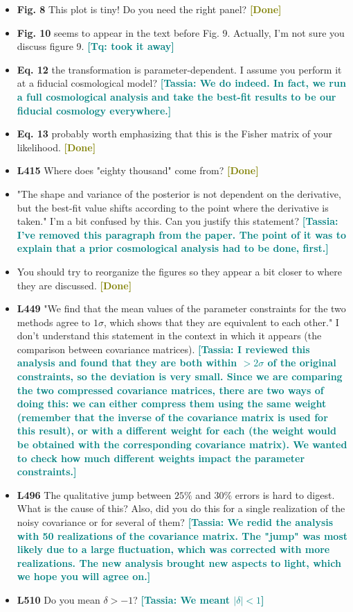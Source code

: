 \documentclass{article}
\newcommand\tassia[1]{{\bf {\textcolor{teal}{[Tassia: #1]}}}}
\newcommand\tq[1]{{\bf {\textcolor{teal}{[Tq: #1]}}}}
\newcommand\done{{\bf {\textcolor{olive}{[Done]}}}}
\begin{document}
\begin{itemize}
	\item \textbf{Fig. 8} This plot is tiny! Do you need the right panel? \done
	\item \textbf{Fig. 10} seems to appear in the text before Fig. 9. Actually, I'm not sure you discuss figure 9. \tq{took it away}
	\item \textbf{Eq. 12} the transformation is parameter-dependent. I assume you perform it at a fiducial cosmological model? \tassia{We do indeed. In fact, we run a full cosmological analysis and take the best-fit results to be our fiducial cosmology everywhere.}
	\item \textbf{Eq. 13} probably worth emphasizing that this is the Fisher matrix of your likelihood. \done
	\item \textbf{L415} Where does "eighty thousand" come from? \done
	\item "The shape and variance of the posterior is not dependent on the derivative, but the best-fit value shifts according to the point where the derivative is taken." I'm a bit confused by this. Can you justify this statement? \tassia{I've removed this paragraph from the paper. The point of it was to explain that a prior cosmological analysis had to be done, first.}
	\item You should try to reorganize the figures so they appear a bit closer to where they are discussed. \done
	\item \textbf{L449} "We find that the mean values of the parameter constraints for the two methods agree to $1 \sigma$, which shows that they are equivalent to each other." I don't understand this statement in the context in which it appears (the comparison between covariance matrices). \tassia{I reviewed this analysis and found that they are both within $> 2\sigma$ of the original constraints, so the deviation is very small. Since we are comparing the two compressed covariance matrices, there are two ways of doing this: we can either compress them using the same weight (remember that the inverse of the covariance matrix is used for this result), or with a different weight for each (the weight would be obtained with the corresponding covariance matrix). We wanted to check how much different weights impact the parameter constraints.}
	\item \textbf{L496} The qualitative jump between $25\%$ and $30\%$ errors is hard to digest. What is the cause of this? Also, did you do this for a single realization of the noisy covariance or for several of them? \tassia{We redid the analysis with 50 realizations of the covariance matrix. The "jump" was most likely due to a large fluctuation, which was corrected with more realizations. The new analysis brought new aspects to light, which we hope you will agree on.}
	\item \textbf{L510} Do you mean $\delta > -1$? \tassia{We meant $|\delta| < 1$} \\
	\end{itemize}
\end{document}
